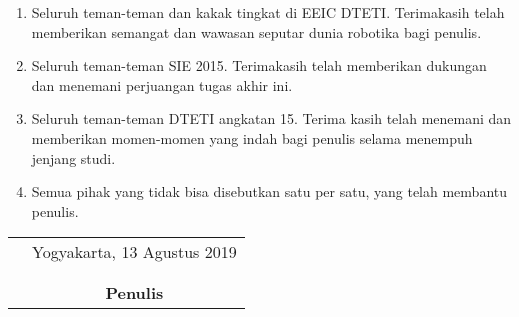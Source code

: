 \documentclass[../thesis.tex]{subfiles}
\begin{document}
\begin{enumerate}
\item{Seluruh teman-teman dan kakak tingkat di EEIC DTETI. Terimakasih telah memberikan semangat dan wawasan seputar dunia robotika bagi penulis.} 
\item{Seluruh teman-teman SIE 2015. Terimakasih telah memberikan dukungan dan menemani perjuangan tugas akhir ini.} 
\item{Seluruh teman-teman DTETI angkatan 15. Terima kasih telah menemani dan memberikan momen-momen yang indah bagi penulis selama menempuh jenjang studi.}
\item{Semua pihak yang tidak bisa disebutkan satu per satu, yang telah membantu penulis.}
\end{enumerate}

\vspace{0.5cm}

\begin{tabular}{p{7.5cm}c}
&Yogyakarta, 13 Agustus 2019\\
&\\
&\\
&\textbf{Penulis}
\end{tabular}
\end{document}
